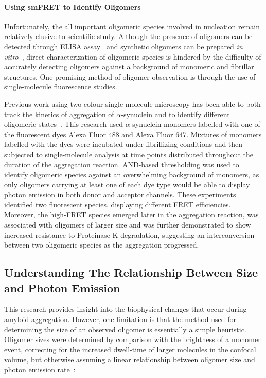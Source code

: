 \paragraph{Using smFRET to Identify Oligomers}
Unfortunately, the all important oligomeric species involved in nucleation remain relatively elusive to scientific study. Although the presence of oligomers can be detected through ELISA assay~\cite{Schmidt2005} and synthetic oligomers can be prepared {\emph{in vitro}}~\cite{Lashuel2002, Murray2003}, direct characterization of oligomeric species is hindered by the difficulty of accurately detecting oligomers against a background of monomeric and fibrillar structures. One promising method of oligomer observation is through the use of single-molecule fluorescence studies.

Previous work using two colour single-molecule microscopy has been able to both track the kinetics of aggregation of $\alpha$-synuclein and to identify different oligomeric states~\cite{orte08, cremades2012}. This research used $\alpha$-synuclein monomers labelled with one of the fluorescent dyes Alexa Fluor 488 and Alexa Fluor 647. Mixtures of monomers labelled with the dyes were incubated under fibrillizing conditions and then subjected to single-molecule analysis at time points distributed throughout the duration of the aggregation reaction. AND-based thresholding was used to identify oligomeric species against an overwhelming background of monomers, as only oligomers carrying at least one of each dye type would be able to display photon emission in both donor and acceptor channels. These experiments identified two fluorescent species, displaying different FRET efficiencies. Moreover, the high-FRET species emerged later in the aggregation reaction, was associated with oligomers of larger size and was further demonstrated to show increased resistance to Proteinase K degradation, suggesting an interconversion between two oligomeric species as the aggregation progressed.

\subsection{Understanding The Relationship Between Size and Photon Emission}


This research provides insight into the biophysical changes that occur during amyloid aggregation. However, one limitation is that the method used for determining the size of an observed oligomer is essentially a simple heuristic. Oligomer sizes were determined by comparison with the brightness of a monomer event, correcting for the increased dwell-time of larger molecules in the confocal volume, but otherwise assuming a linear relationship between oligomer size and photon emission rate~\cite{orte08}:

